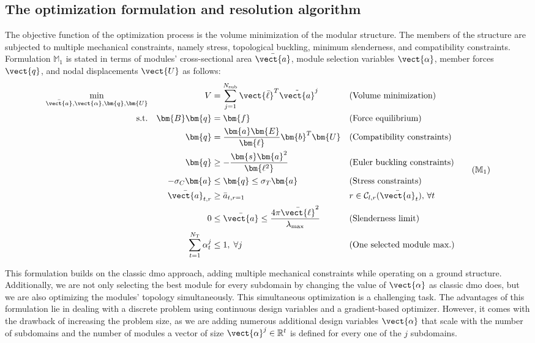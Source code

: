 \subsection{The optimization formulation and resolution algorithm}
The objective function of the optimization process is the volume minimization of the modular structure. The members of the structure are subjected to multiple mechanical constraints, namely stress, topological buckling, minimum slenderness, and compatibility constraints. Formulation $\mathbb{M}_1$ is stated in terms of modules' cross-sectional area $\bar{\vect{a}}$, module selection variables $\vect{\alpha}$, member forces $\vect{q}$, and nodal displacements $\vect{U}$ as follows:
\begin{equation}
    \begin{aligned}
    \min_{\bar{\vect{a}}, \vect{\alpha}, \bm{q}, \bm{U}}   && V &= \sum_{j=1}^{N_{\text{sub}}}\vect{\bar{\ell}}^T\tilde{\vect{a}}^j && \textrm{(Volume minimization)}\\
    \textrm{s.t.}   && \bm{B}\bm{q} &= \bm{f} && \textrm{(Force equilibrium)}\\
                    && \bm{q} &= \frac{\bm{a}\bm{E}}{\bm{\ell}}\bm{b}^T\bm{U} && \textrm{(Compatibility constraints)} \\
                    && \bm{q} &\geq -\frac{\bm{s}\bm{a}^2}{\bm{\ell^2}} && \textrm{(Euler buckling constraints)} \\
                    && -\sigma_C\bm{a} &\leq \bm{q} \leq \sigma_T\bm{a} && \textrm{(Stress constraints)} \\
                    && \bar{\vect{a}}_{t,r}&\geq \bar{a}_{t,r=1} && r \in \mathcal{C}_{l,r}(\bar{\vect{a}}_t),\, \forall t \\
                    && 0 &\leq \bar{\vect{a}} \leq \frac{4 \pi \bar{\vect{\ell}}^2}{\lambda_{\text{max}}} && \textrm{(Slenderness limit)} \\
                    && \sum_{t=1}^{N_\text{T}} \alpha_t^j &\leq 1, \; \forall j && \textrm{(One selected module max.)} \\
    \end{aligned}
    \tag{$\mathbb{M}_1$}
    \label{eq:06_optim_complete}
\end{equation}

This formulation builds on the classic \gls{dmo} approach, adding multiple mechanical constraints while operating on a ground structure. Additionally, we are not only selecting the best module for every subdomain by changing the value of $\vect{\alpha}$ as classic \gls{dmo} does, but we are also optimizing the modules' topology simultaneously. This simultaneous optimization is a challenging task. The advantages of this formulation lie in dealing with a discrete problem using continuous design variables and a gradient-based optimizer. However, it comes with the drawback of increasing the problem size, as we are adding numerous additional design variables $\vect{\alpha}$ that scale with the number of subdomains and the number of modules \ie a vector of size $\vect{\alpha}^j \in \mathbb{R}^t$ is defined for every one of the $j$ subdomains.

